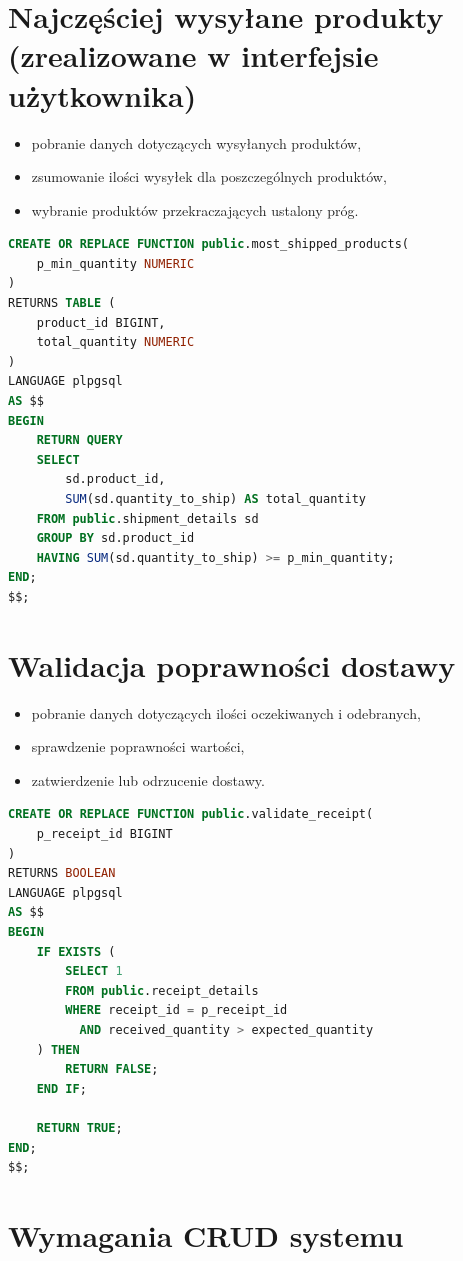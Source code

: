 \section{Najczęściej wysyłane produkty (zrealizowane w interfejsie użytkownika)}
\begin{itemize}
    \item pobranie danych dotyczących wysyłanych produktów,
    \item zsumowanie ilości wysyłek dla poszczególnych produktów,
    \item wybranie produktów przekraczających ustalony próg.
\end{itemize}

\begin{lstlisting}[language=SQL, caption={Funkcja identyfikująca najczęściej wysyłane produkty}]
CREATE OR REPLACE FUNCTION public.most_shipped_products(
    p_min_quantity NUMERIC
)
RETURNS TABLE (
    product_id BIGINT,
    total_quantity NUMERIC
)
LANGUAGE plpgsql
AS $$
BEGIN
    RETURN QUERY
    SELECT
        sd.product_id,
        SUM(sd.quantity_to_ship) AS total_quantity
    FROM public.shipment_details sd
    GROUP BY sd.product_id
    HAVING SUM(sd.quantity_to_ship) >= p_min_quantity;
END;
$$;
\end{lstlisting}

\section{Walidacja poprawności dostawy}
\begin{itemize}
    \item pobranie danych dotyczących ilości oczekiwanych i odebranych,
    \item sprawdzenie poprawności wartości,
    \item zatwierdzenie lub odrzucenie dostawy.
\end{itemize}

\begin{lstlisting}[language=SQL, caption={Funkcja walidująca poprawność dostawy}]
CREATE OR REPLACE FUNCTION public.validate_receipt(
    p_receipt_id BIGINT
)
RETURNS BOOLEAN
LANGUAGE plpgsql
AS $$
BEGIN
    IF EXISTS (
        SELECT 1
        FROM public.receipt_details
        WHERE receipt_id = p_receipt_id
          AND received_quantity > expected_quantity
    ) THEN
        RETURN FALSE;
    END IF;

    RETURN TRUE;
END;
$$;
\end{lstlisting}

\section{Wymagania CRUD systemu}

